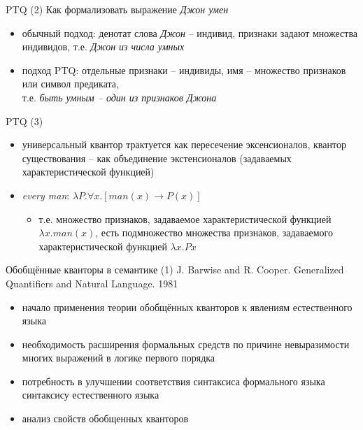 \documentclass{beamer}
\begin{document}
\begin{frame}{PTQ (2)}
Как формализовать выражение \textit{Джон умен}
\bigskip
\begin{itemize}
   	\item обычный подход: денотат слова \textit{Джон} -- индивид, признаки задают множества индивидов, т.е. \textit{Джон из числа умных}
   	\medskip
   	\item подход PTQ: отдельные признаки -- индивиды, имя -- множество признаков или символ предиката,\\ т.е. \textit{быть умным -- один из признаков Джона}
\end{itemize}
\end{frame}

\begin{frame}{PTQ (3)}
\begin{itemize}
	\item универсальный квантор трактуется как пересечение эксенсионалов, квантор существования -- как объединение экстенсионалов (задаваемых характеристической функцией)
    \medskip
    \item \textit{every man}: $\lambda P . \forall x . [ man(x) \to P(x) ]$ 
        \medskip
        \begin{itemize}
            \item[] т.е. множество признаков, задаваемое характеристической функцией $\lambda x . man(x)$, есть подмножество множества признаков, задаваемого характеристической функцией $\lambda x . Px$
        \end{itemize}
\end{itemize}
\end{frame}

\begin{frame}{Обобщённые кванторы в семантике (1)}
J. Barwise and R. Cooper. Generalized Quantifiers and Natural Language. 1981
\bigskip
\begin{itemize}
	\item начало применения теории обобщённых кванторов к явлениям естественного языка
	\item необходимость расширения формальных средств по причине невыразимости многих выражений в логике первого порядка
	\item потребность в улучшении соответствия синтаксиса формального языка синтаксису естественного языка
	\item анализ свойств обобщенных кванторов
\end{itemize}
\end{frame}
\end{document}
